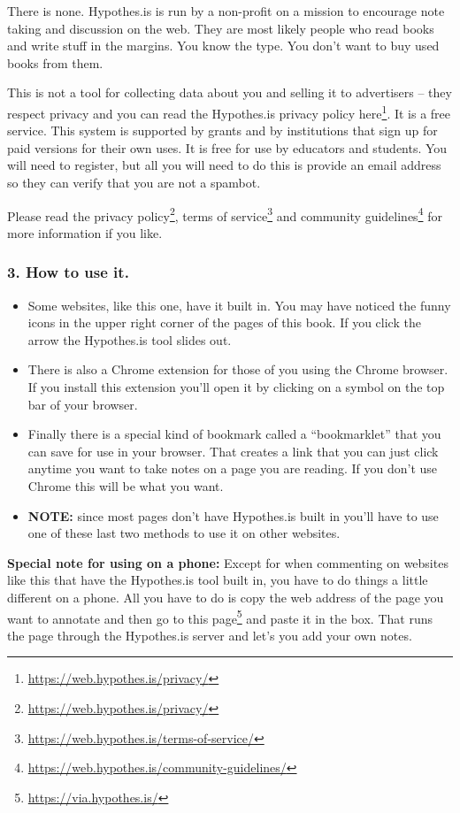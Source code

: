 \documentclass[12pt, openany]{book}
\makeatletter
\renewcommand{\href}[2]{#2\footnote{\url{#1}}}
\newenvironment{kframe}{%
\medskip{}
\setlength{\fboxsep}{.8em}
 \def\at@end@of@kframe{}%
 \ifinner\ifhmode%
  \def\at@end@of@kframe{\end{minipage}}%
  \begin{minipage}{\columnwidth}%
 \fi\fi%
 \def\FrameCommand##1{\hskip\@totalleftmargin \hskip-\fboxsep
 \colorbox{shadecolor}{##1}\hskip-\fboxsep
     \hskip-\linewidth \hskip-\@totalleftmargin \hskip\columnwidth}%
 \MakeFramed {\advance\hsize-\width
   \@totalleftmargin\z@ \linewidth\hsize
   \@setminipage}}%
 {\par\unskip\endMakeFramed%
 \at@end@of@kframe}
\newenvironment{rmdblock}[1]
  {
  \begin{itemize}
  \renewcommand{\labelitemi}{
    \raisebox{-.7\height}[0pt][0pt]{
      {\setkeys{Gin}{width=3em,keepaspectratio}\texttt{[image: img/\#1]}}
    }
  }
  \setlength{\fboxsep}{1em}
  \begin{kframe}
  \item
  }
  {
  \end{kframe}
  \end{itemize}
  }
\newenvironment{note}
  {\begin{rmdblock}{note}}
  {\end{rmdblock}}
\makeatother
\begin{document}
There is none. Hypothes.is is run by a non-profit on a mission to encourage note taking and discussion on the web. They are most likely people who read books and write stuff in the margins. You know the type. You don't want to buy used books from them.

This is not a tool for collecting data about you and selling it to advertisers -- they respect privacy and you can read \href{https://web.hypothes.is/privacy/}{the Hypothes.is privacy policy here}. It is a free service. This system is supported by grants and by institutions that sign up for paid versions for their own uses. It is free for use by educators and students. You will need to register, but all you will need to do this is provide an email address so they can verify that you are not a spambot.

Please read the \href{https://web.hypothes.is/privacy/}{privacy policy}, \href{https://web.hypothes.is/terms-of-service/}{terms of service} and \href{https://web.hypothes.is/community-guidelines/}{community guidelines} for more information if you like.

\hypertarget{how-to-use-it.}{%
\subsubsection*{3. How to use it.}\label{how-to-use-it.}}


\begin{itemize}
\item
  Some websites, like this one, have it built in. You may have noticed the funny icons in the upper right corner of the pages of this book. If you click the arrow the Hypothes.is tool slides out.
\item
  There is also a Chrome extension for those of you using the Chrome browser. If you install this extension you'll open it by clicking on a symbol on the top bar of your browser.
\item
  Finally there is a special kind of bookmark called a ``bookmarklet'' that you can save for use in your browser. That creates a link that you can just click anytime you want to take notes on a page you are reading. If you don't use Chrome this will be what you want.
\item
  \textbf{NOTE:} since most pages don't have Hypothes.is built in you'll have to use one of these last two methods to use it on other websites.
\end{itemize}

\begin{note}

\textbf{Special note for using on a phone:} Except for when commenting on websites like this that have the Hypothes.is tool built in, you have to do things a little different on a phone. All you have to do is copy the web address of the page you want to annotate and then \href{https://via.hypothes.is/}{go to this page} and paste it in the box. That runs the page through the Hypothes.is server and let's you add your own notes.

\end{note}
\end{document}
